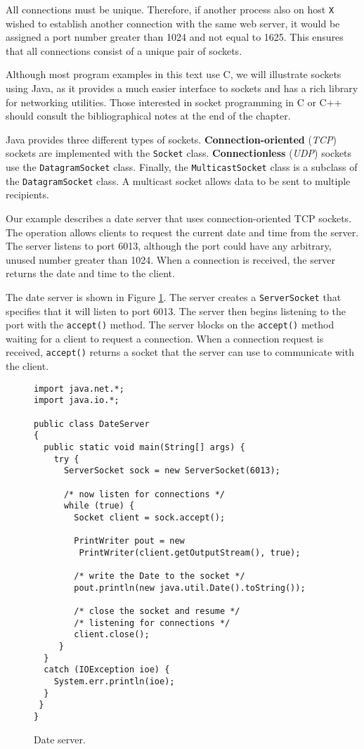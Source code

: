 All connections must be unique. Therefore, if another process also on host \texttt{X} wished to establish another connection with the same web server, it would be assigned a port number greater than 1024 and not equal to 1625. This ensures that all connections consist of a unique pair of sockets.

Although most program examples in this text use C, we will illustrate sockets using Java, as it provides a much easier interface to sockets and has a rich library for networking utilities. Those interested in socket programming in C or C++ should consult the bibliographical notes at the end of the chapter.

Java provides three different types of sockets. \textbf{Connection-oriented} (\textit{TCP}) sockets are implemented with the \texttt{Socket} class. \textbf{Connectionless} (\textit{UDP}) sockets use the \texttt{DatagramSocket} class. Finally, the \texttt{MulticastSocket} class is a subclass of the \texttt{DatagramSocket} class. A multicast socket allows data to be sent to multiple recipients.

Our example describes a date server that uses connection-oriented TCP sockets. The operation allows clients to request the current date and time from the server. The server listens to port 6013, although the port could have any arbitrary, unused number greater than 1024. When a connection is received, the server returns the date and time to the client.

The date server is shown in Figure \ref{fig:date-server}. The server creates a \texttt{ServerSocket} that specifies that it will listen to port 6013. The server then begins listening to the port with the \texttt{accept()} method. The server blocks on the \texttt{accept()} method waiting for a client to request a connection. When a connection request is received, \texttt{accept()} returns a socket that the server can use to communicate with the client.

\begin{figure}[h!]
\centering
\begin{verbatim}
import java.net.*;
import java.io.*;
 
public class DateServer
{
  public static void main(String[] args) {
    try {
      ServerSocket sock = new ServerSocket(6013);
 
      /* now listen for connections */
      while (true) {
        Socket client = sock.accept();
 
        PrintWriter pout = new
         PrintWriter(client.getOutputStream(), true);
 
        /* write the Date to the socket */
        pout.println(new java.util.Date().toString());
 
        /* close the socket and resume */
        /* listening for connections */
        client.close();
     }
  }
  catch (IOException ioe) {
    System.err.println(ioe);
  }
 }
}
\end{verbatim}
\caption{Date server.}\label{fig:date-server}
\end{figure}


